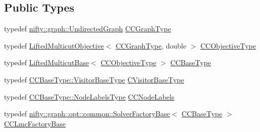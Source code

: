 \subsection*{Public Types}
\begin{DoxyCompactItemize}
\item 
typedef \hyperlink{classnifty_1_1graph_1_1UndirectedGraph}{nifty\+::graph\+::\+Undirected\+Graph} \hyperlink{classnifty_1_1graph_1_1opt_1_1lifted__multicut_1_1PixelWiseLmcConnetedComponentsFusion_3_013_01_4_abbfd6800c04cc256d689973355268452}{C\+C\+Graph\+Type}
\item 
typedef \hyperlink{classnifty_1_1graph_1_1opt_1_1lifted__multicut_1_1LiftedMulticutObjective}{Lifted\+Multicut\+Objective}$<$ \hyperlink{classnifty_1_1graph_1_1opt_1_1lifted__multicut_1_1PixelWiseLmcConnetedComponentsFusion_3_013_01_4_abbfd6800c04cc256d689973355268452}{C\+C\+Graph\+Type}, double $>$ \hyperlink{classnifty_1_1graph_1_1opt_1_1lifted__multicut_1_1PixelWiseLmcConnetedComponentsFusion_3_013_01_4_a0373c065e49f38aceda0c6f950735270}{C\+C\+Objective\+Type}
\item 
typedef \hyperlink{classnifty_1_1graph_1_1opt_1_1lifted__multicut_1_1LiftedMulticutBase}{Lifted\+Multicut\+Base}$<$ \hyperlink{classnifty_1_1graph_1_1opt_1_1lifted__multicut_1_1PixelWiseLmcConnetedComponentsFusion_3_013_01_4_a0373c065e49f38aceda0c6f950735270}{C\+C\+Objective\+Type} $>$ \hyperlink{classnifty_1_1graph_1_1opt_1_1lifted__multicut_1_1PixelWiseLmcConnetedComponentsFusion_3_013_01_4_ac1b60c33540a464d9d21651885d12ba4}{C\+C\+Base\+Type}
\item 
typedef \hyperlink{classnifty_1_1graph_1_1opt_1_1common_1_1SolverBase_ad9932afb08dd17d375de4b15da9ffaa6}{C\+C\+Base\+Type\+::\+Visitor\+Base\+Type} \hyperlink{classnifty_1_1graph_1_1opt_1_1lifted__multicut_1_1PixelWiseLmcConnetedComponentsFusion_3_013_01_4_a0a547cb867f76b1fbee4a0c957c4dc96}{C\+Visitor\+Base\+Type}
\item 
typedef \hyperlink{classnifty_1_1graph_1_1opt_1_1common_1_1SolverBase_abefd51561de2fd009f6bed6bef6009ea}{C\+C\+Base\+Type\+::\+Node\+Labels\+Type} \hyperlink{classnifty_1_1graph_1_1opt_1_1lifted__multicut_1_1PixelWiseLmcConnetedComponentsFusion_3_013_01_4_a6c180f79042250548dd73a1ac42b9b38}{C\+C\+Node\+Labels}
\item 
typedef \hyperlink{classnifty_1_1graph_1_1opt_1_1common_1_1SolverFactoryBase}{nifty\+::graph\+::opt\+::common\+::\+Solver\+Factory\+Base}$<$ \hyperlink{classnifty_1_1graph_1_1opt_1_1lifted__multicut_1_1PixelWiseLmcConnetedComponentsFusion_3_013_01_4_ac1b60c33540a464d9d21651885d12ba4}{C\+C\+Base\+Type} $>$ \hyperlink{classnifty_1_1graph_1_1opt_1_1lifted__multicut_1_1PixelWiseLmcConnetedComponentsFusion_3_013_01_4_a9e78fe926b2fe9e0d3f4b8fa2c4fed1f}{C\+C\+Lmc\+Factory\+Base}
\end{DoxyCompactItemize}
